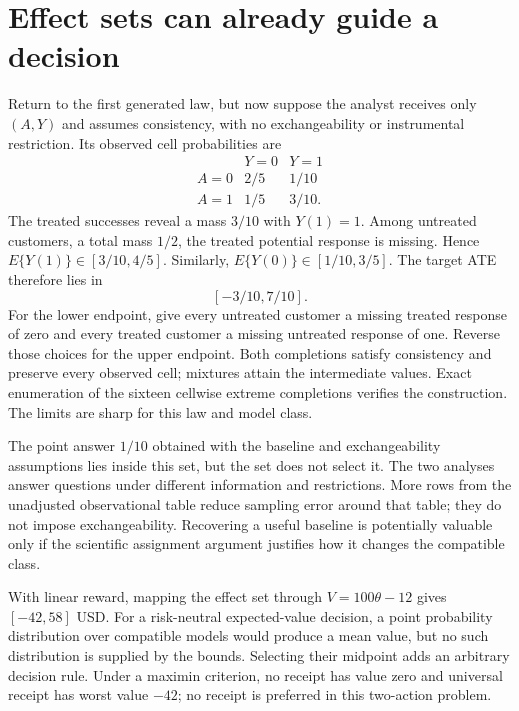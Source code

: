 \section{Effect sets can already guide a decision}
\label{exec17:s3-bounds}

Return to the first generated law, but now suppose the analyst
receives only $(A,Y)$ and assumes consistency, with no
exchangeability or instrumental restriction. Its observed
cell probabilities are
\[
\begin{array}{c|cc}
 &Y=0&Y=1\\ \hline
 A=0&2/5&1/10\\
 A=1&1/5&3/10 .
\end{array}
\]
The treated successes reveal a mass $3/10$ with $Y(1)=1$.
Among untreated customers, a total mass $1/2$, the treated
potential response is missing. Hence
$E\{Y(1)\}\in[3/10,4/5]$. Similarly,
$E\{Y(0)\}\in[1/10,3/5]$.
The target ATE therefore lies in
\[
 [-3/10,7/10].
\]
For the lower endpoint, give every untreated customer a
missing treated response of zero and every treated customer
a missing untreated response of one. Reverse those choices
for the upper endpoint. Both completions satisfy consistency
and preserve every observed cell; mixtures attain the
intermediate values. Exact enumeration of the sixteen
cellwise extreme completions verifies the construction.
The limits are sharp for this law and model
class.~\citep{exec17_s3_exact}

The point answer $1/10$ obtained with the baseline and
exchangeability assumptions lies inside this set, but the
set does not select it. The two analyses answer questions
under different information and restrictions. More rows
from the unadjusted observational table reduce sampling
error around that table; they do not impose exchangeability.
Recovering a useful baseline is potentially valuable only
if the scientific assignment argument justifies how it
changes the compatible class.

With linear reward, mapping the effect set through
$V=100\theta-12$ gives $[-42,58]$ USD.
For a risk-neutral expected-value decision, a point
probability distribution over compatible models would
produce a mean value, but no such distribution is supplied
by the bounds. Selecting their midpoint adds an arbitrary
decision rule. Under a maximin criterion, no receipt has
value zero and universal receipt has worst value $-42$;
no receipt is preferred in this two-action problem.

